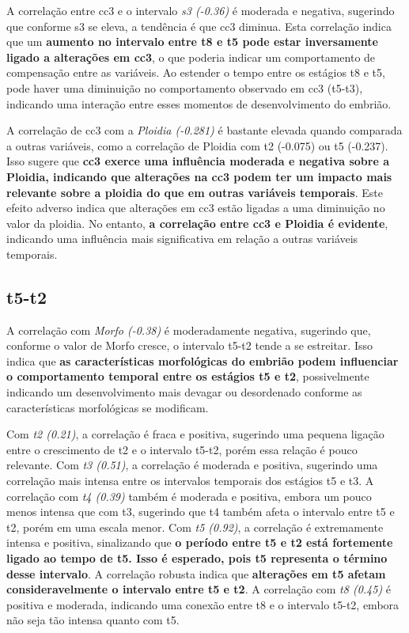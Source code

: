 A correlação entre cc3 e o intervalo \textit{s3 (-0.36)} é moderada e negativa, sugerindo que conforme s3 se eleva, a tendência é que cc3 diminua. Esta correlação indica que um \textbf{aumento no intervalo entre t8 e t5 pode estar inversamente ligado a alterações em cc3}, o que poderia indicar um comportamento de compensação entre as variáveis. Ao estender o tempo entre os estágios t8 e t5, pode haver uma diminuição no comportamento observado em cc3 (t5-t3), indicando uma interação entre esses momentos de desenvolvimento do embrião.

A correlação de cc3 com a \textit{Ploidia (-0.281)} é bastante elevada quando comparada a outras variáveis, como a correlação de Ploidia com t2 (-0.075) ou t5 (-0.237). Isso sugere que \textbf{cc3 exerce uma influência moderada e negativa sobre a Ploidia, indicando que alterações na cc3 podem ter um impacto mais relevante sobre a ploidia do que em outras variáveis temporais}. Este efeito adverso indica que alterações em cc3 estão ligadas a uma diminuição no valor da ploidia. No entanto, \textbf{a correlação entre cc3 e Ploidia é evidente}, indicando uma influência mais significativa em relação a outras variáveis temporais.

\subsection*{t5-t2}
A correlação com \textit{Morfo (-0.38)} é moderadamente negativa, sugerindo que, conforme o valor de Morfo cresce, o intervalo t5-t2 tende a se estreitar. Isso indica que \textbf{as características morfológicas do embrião podem influenciar o comportamento temporal entre os estágios t5 e t2}, possivelmente indicando um desenvolvimento mais devagar ou desordenado conforme as características morfológicas se modificam.

Com \textit{t2 (0.21)}, a correlação é fraca e positiva, sugerindo uma pequena ligação entre o crescimento de t2 e o intervalo t5-t2, porém essa relação é pouco relevante. Com \textit{t3 (0.51)}, a correlação é moderada e positiva, sugerindo uma correlação mais intensa entre os intervalos temporais dos estágios t5 e t3. A correlação com \textit{t4 (0.39)} também é moderada e positiva, embora um pouco menos intensa que com t3, sugerindo que t4 também afeta o intervalo entre t5 e t2, porém em uma escala menor. Com \textit{t5 (0.92)}, a correlação é extremamente intensa e positiva, sinalizando que \textbf{o período entre t5 e t2 está fortemente ligado ao tempo de t5. Isso é esperado, pois t5 representa o término desse intervalo}. A correlação robusta indica que \textbf{alterações em t5 afetam consideravelmente o intervalo entre t5 e t2}. A correlação com \textit{t8 (0.45)} é positiva e moderada, indicando uma conexão entre t8 e o intervalo t5-t2, embora não seja tão intensa quanto com t5.

